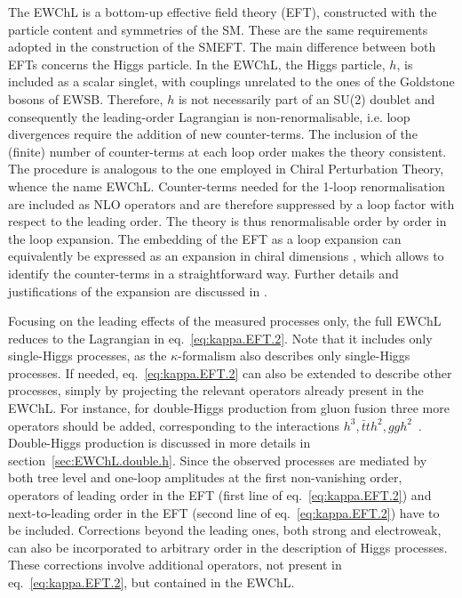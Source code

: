 The EWChL\cite{Dobado:1989ax,Dobado:1989ue,Dobado:1990zh,Dobado:1990jy,Espriu:1991vm,Herrero:1993nc,Herrero:1994iu,Feruglio:1992wf,Bagger:1993zf,Koulovassilopoulos:1993pw,Burgess:1999ha,Wang:2006im,Grinstein:2007iv,Azatov:2012bz,Alonso:2012px,Buchalla:2012qq,Buchalla:2013rka,Buchalla:2013eza} is a bottom-up effective field theory (EFT), constructed with the particle content and symmetries of the SM. These are the same requirements adopted in the construction of the SMEFT. The main difference between both EFTs concerns the Higgs particle. In the EWChL, the Higgs particle, $h$, is included as a scalar singlet, with couplings unrelated to the ones of the Goldstone bosons of EWSB. Therefore, $h$ is not necessarily part of an SU(2) doublet and consequently the leading-order Lagrangian is non-renormalisable, i.e. loop divergences require the addition of new counter-terms. The inclusion of the (finite) number of counter-terms at each loop order makes the theory consistent. The procedure is analogous to the one employed in Chiral Perturbation Theory, whence the name EWChL. Counter-terms needed for the 1-loop renormalisation \cite{Guo:2015isa,Buchalla:2017jlu,Alonso:2017tdy} are included as NLO operators\cite{Buchalla:2013rka} and are therefore suppressed by a loop factor with respect to the leading order. The theory is thus renormalisable order by order in the loop expansion. The embedding of the EFT as a loop expansion can equivalently be expressed as an expansion in chiral dimensions \cite{Buchalla:2013eza}, which allows to identify the counter-terms in a straightforward way. Further details and justifications of the expansion are discussed in \cite{Buchalla:2013rka,Buchalla:2013eza,Buchalla:2015wfa,Buchalla:2016sop}.

Focusing on the leading effects of the measured processes only, the full EWChL reduces to the Lagrangian in eq.~\eqref{eq:kappa.EFT.2}. Note that it includes only single-Higgs processes, as the $\kappa$-formalism also describes only single-Higgs processes. If needed, eq.~\eqref{eq:kappa.EFT.2} can also be extended to describe other processes, simply by projecting the relevant operators already present in the EWChL. For instance, for double-Higgs production from gluon fusion three more operators should be added, corresponding to the interactions $h^{3},\bar{t}th^{2},ggh^{2}$~\cite{Grober:2015cwa,deFlorian:2016spz,Kim:2018uty,Buchalla:2018yce}. Double-Higgs production is discussed in more details in section~\ref{sec:EWChL.double.h}. Since the observed processes are mediated by both tree level and one-loop amplitudes at the first non-vanishing order, operators of leading order in the EFT (first line of eq.~\eqref{eq:kappa.EFT.2}) and next-to-leading order in the EFT (second line of eq.~\eqref{eq:kappa.EFT.2}) have to be included\cite{Buchalla:2015wfa}. Corrections beyond the leading ones, both strong and electroweak, can also be incorporated to arbitrary order in the description of Higgs processes. These corrections involve additional operators, not present in eq.~\eqref{eq:kappa.EFT.2}, but contained in the EWChL.

